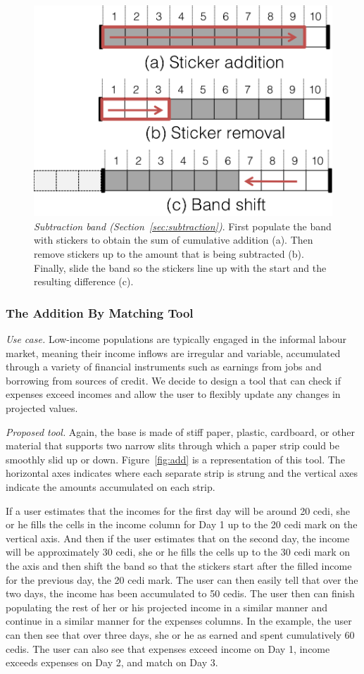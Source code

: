 \documentclass{sig-alternate}
\begin{document}
\begin{figure}
\centering
\includegraphics[width=.6\linewidth]{img/band.png}
\caption{\emph{Subtraction band (Section~\ref{sec:subtraction})}. First populate the band with stickers to obtain the sum of cumulative addition (a). Then remove stickers up to the amount that is being subtracted (b). Finally, slide the band so the stickers line up with the start and the resulting difference (c).}
\label{fig:band}
\end{figure}

\subsubsection{The Addition By Matching Tool}
\label{sec:add}

\emph{Use case.} Low-income populations are typically engaged in the informal labour market, meaning their income inflows are irregular and variable, accumulated through a variety of financial instruments such as earnings from jobs and borrowing from sources of credit. We decide to design a tool that can check if expenses exceed incomes and allow the user to flexibly update any changes in projected values.

\emph{Proposed tool.} Again, the base is made of stiff paper, plastic, cardboard, or other material that supports two narrow slits through which a paper strip could be smoothly slid up or down. Figure~\ref{fig:add} is a representation of this tool. The horizontal axes indicates where each separate strip is strung and the vertical axes indicate the amounts accumulated on each strip.

If a user estimates that the incomes for the first day will be around 20 cedi, she or he fills the cells in the income column for Day 1 up to the 20 cedi mark on the vertical axis. And then if the user estimates that on the second day, the income will be approximately 30 cedi, she or he fills the cells up to the 30 cedi mark on the axis and then shift the band so that the stickers start after the filled income for the previous day, the 20 cedi mark. The user can then easily tell that over the two days, the income has been accumulated to 50 cedis. The user then can finish populating the rest of her or his projected income in a similar manner and continue in a similar manner for the expenses columns. In the example, the user can then see that over three days, she or he as earned and spent cumulatively 60 cedis. The user can also see that expenses exceed income on Day 1, income exceeds expenses on Day 2, and match on Day 3.
\end{document}
